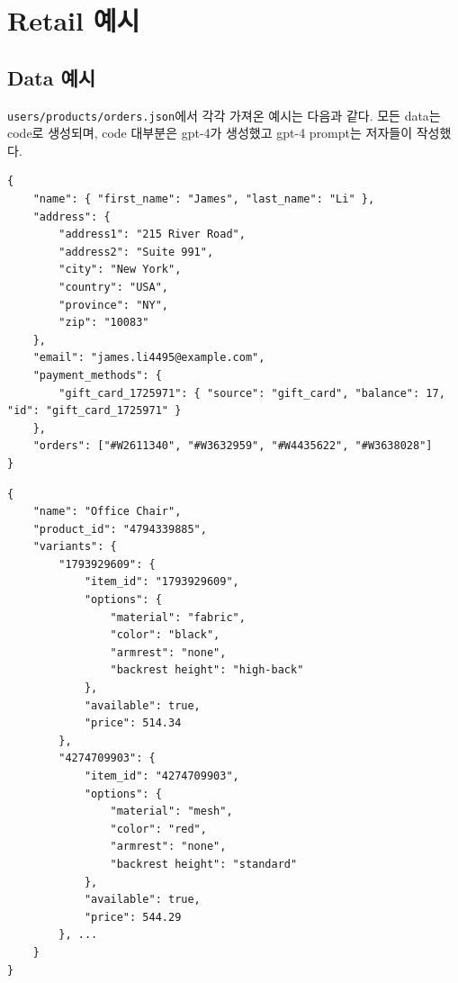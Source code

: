 \newpage
\section{Retail 예시} \label{sec:retail_details}

\subsection{Data 예시} \label{sec:retail_data}
\texttt{users/products/orders.json}에서 각각 가져온 예시는 다음과 같다. 모든 data는 code로 생성되며, code 대부분은 gpt-4가 생성했고 gpt-4 prompt는 저자들이 작성했다.

\begin{listing}[ht]
\begin{verbatim}
{
    "name": { "first_name": "James", "last_name": "Li" },
    "address": {
        "address1": "215 River Road",
        "address2": "Suite 991",
        "city": "New York",
        "country": "USA",
        "province": "NY",
        "zip": "10083"
    },
    "email": "james.li4495@example.com",
    "payment_methods": {
        "gift_card_1725971": { "source": "gift_card", "balance": 17, "id": "gift_card_1725971" }
    },
    "orders": ["#W2611340", "#W3632959", "#W4435622", "#W3638028"]
}
\end{verbatim}
\caption{\retail{}의 users database entry 예시.}
\end{listing}




\begin{listing}[ht]
\begin{verbatim}
{
    "name": "Office Chair",
    "product_id": "4794339885",
    "variants": {
        "1793929609": {
            "item_id": "1793929609",
            "options": {
                "material": "fabric",
                "color": "black",
                "armrest": "none",
                "backrest height": "high-back"
            },
            "available": true,
            "price": 514.34
        },
        "4274709903": {
            "item_id": "4274709903",
            "options": {
                "material": "mesh",
                "color": "red",
                "armrest": "none",
                "backrest height": "standard"
            },
            "available": true,
            "price": 544.29
        }, ...
    }
}
\end{verbatim}
\caption{\retail{}의 products database entry 예시(추가 variant는 생략).}
\end{listing}



